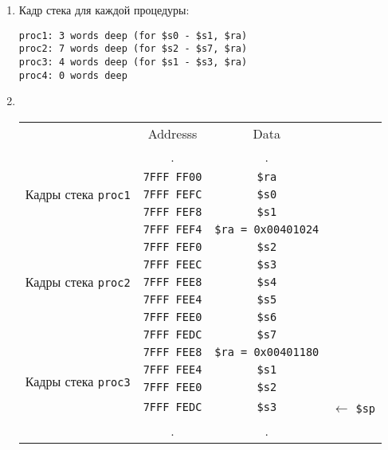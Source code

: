 \documentclass[12pt]{article}
\begin{document}
    \begin{enumerate}
        \item Кадр стека для каждой процедуры:
        \begin{verbatim}
proc1: 3 words deep (for $s0 - $s1, $ra)
proc2: 7 words deep (for $s2 - $s7, $ra)
proc3: 4 words deep (for $s1 - $s3, $ra)
proc4: 0 words deep
        \end{verbatim}
        \newpage
        \item ~
        \begin{table}[h!]
            \small
            \setlength\tabcolsep{2pt}
            \centering
            \begin{tabular}{c|c|c|c}
                & Addresss & Data & \\
                & . & . & \\
                \hline
                \multirow{3}{*}{Кадры стека \texttt{proc1}} & \texttt{7FFF FF00} & \texttt{\$ra} & \\
                & \texttt{7FFF FEFC} & \texttt{\$s0} & \\
                & \texttt{7FFF FEF8} & \texttt{\$s1} & \\
                \hline
                \multirow{7}{*}{Кадры стека \texttt{proc2}} & \texttt{7FFF FEF4} & \texttt{\$ra = 0x00401024} & \\
                & \texttt{7FFF FEF0} & \texttt{\$s2} & \\
                & \texttt{7FFF FEEC} & \texttt{\$s3} & \\
                & \texttt{7FFF FEE8} & \texttt{\$s4} & \\
                & \texttt{7FFF FEE4} & \texttt{\$s5} & \\
                & \texttt{7FFF FEE0} & \texttt{\$s6} & \\
                & \texttt{7FFF FEDC} & \texttt{\$s7} & \\
                \hline
                \multirow{4}{*}{Кадры стека \texttt{proc3}} & \texttt{7FFF FEE8} & \texttt{\$ra = 0x00401180} & \\
                & \texttt{7FFF FEE4} & \texttt{\$s1} & \\
                & \texttt{7FFF FEE0} & \texttt{\$s2} & \\
                & \texttt{7FFF FEDC} & \texttt{\$s3} & $\leftarrow$ \texttt{\$sp} \\
                \hline
                & . & . & \\
            \end{tabular}
        \end{table}
    \end{enumerate}
\end{document}
